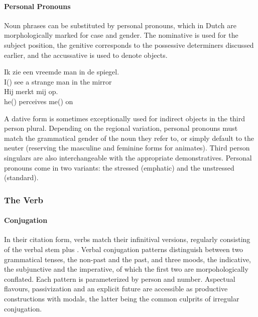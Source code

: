 \paragraph{Personal Pronouns}
Noun phrases can be substituted by personal pronouns, which in Dutch are morphologically marked for case and gender.
The nominative is used for the subject position, the genitive corresponds to the possessive determiners discussed earlier, and the accussative is used to denote objects.
\begin{exe}
\ex
\gll Ik zie een vreemde man in de spiegel.\\
I() see a strange man in the mirror\\
\ex
\gll Hij merkt mij op.\\
he() perceives me() on\\
\end{exe}
A dative form is sometimes exceptionally used for indirect objects in the third person plural.
Depending on the regional variation, personal pronouns must match the grammatical gender of the noun they refer to, or simply default to the neuter (reserving the masculine and feminine forms for animates).
Third person singulars are also interchangeable with the appropriate demonstratives.
Personal pronouns come in two variants: the stressed (emphatic) and the unstressed (standard).

\subsubsection{The Verb}
\paragraph{Conjugation}
In their citation form, verbs match their infinitival versions, regularly consisting of the verbal stem plus .
Verbal conjugation patterns distinguish between two grammatical tenses, the non-past and the past, and three moods, the indicative, the subjunctive and the imperative, of which the first two are morpohologically conflated.
Each pattern is parameterized by person and number.
Aspectual flavours, passivization and an explicit future are accessible as productive constructions with modals, the latter being the common culprits of irregular conjugation.

